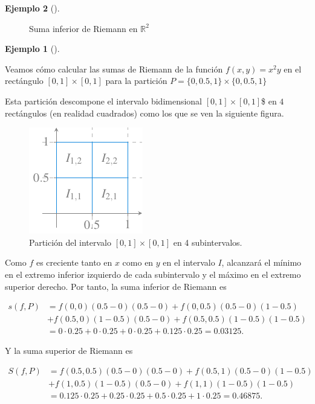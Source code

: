 \documentclass[
  a4paper,
]{scrreport}
\theoremstyle{definition}
\newtheorem{example}{Ejemplo}[chapter]
\theoremstyle{plain}
\theoremstyle{definition}
\theoremstyle{definition}
\theoremstyle{plain}
\theoremstyle{plain}
\theoremstyle{remark}
\begin{document}
\begin{example}[]
\begin{figure}[H]
{}

\caption{Suma inferior de Riemann en \(\mathbb{R}^2\)}

\end{figure}%

\begin{example}[]\protect\hypertarget{exm-sumas-riemann}{}\label{exm-sumas-riemann}

Veamos cómo calcular las sumas de Riemann de la función \(f(x,y)=x^2y\)
en el rectángulo \([0,1]\times [0,1]\) para la partición
\(P=\{0, 0.5, 1\}\times \{0, 0.5, 1\}\)

Esta partición descompone el intervalo bidimensional
\([0,1]\times [0,1]\)\$ en \(4\) rectángulos (en realidad cuadrados)
como los que se ven la siguiente figura.

\begin{figure}[H]

{\centering \includegraphics{img/integrales-funciones-varias-variables/particion-intervalo-bidimensional.pdf}

}

\caption{Partición del intervalo \([0,1]\times [0,1]\) en 4
subintervalos.}

\end{figure}%

Como \(f\) es creciente tanto en \(x\) como en \(y\) en el intervalo
\(I\), alcanzará el mínimo en el extremo inferior izquierdo de cada
subintervalo y el máximo en el extremo superior derecho. Por tanto, la
suma inferior de Riemann es

\begin{align*}
s(f,P) &= f(0,0)(0.5-0)(0.5-0) + f(0,0.5)(0.5-0)(1-0.5) \\
&+ f(0.5,0)(1-0.5)(0.5-0) + f(0.5, 0.5)(1-0.5)(1-0.5) \\
&= 0\cdot 0.25 + 0 \cdot 0.25 + 0 \cdot 0.25 + 0.125 \cdot 0.25 
= 0.03125.
\end{align*}

Y la suma superior de Riemann es

\begin{align*}
S(f,P) &= f(0.5,0.5)(0.5-0)(0.5-0) + f(0.5,1)(0.5-0)(1-0.5) \\
&+ f(1,0.5)(1-0.5)(0.5-0) + f(1, 1)(1-0.5)(1-0.5) \\
&= 0.125\cdot 0.25 + 0.25 \cdot 0.25 + 0.5 \cdot 0.25 + 1 \cdot 0.25 
= 0.46875.
\end{align*}


\end{example}
\end{example}
\end{document}
